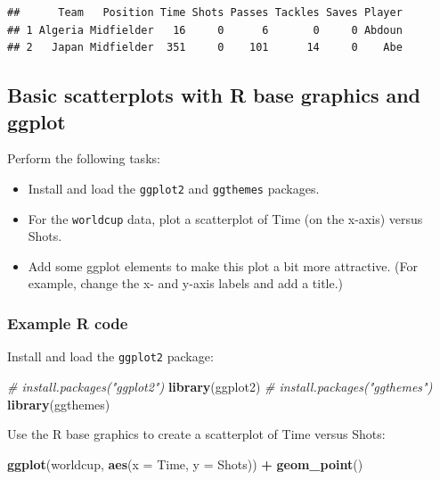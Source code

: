 \documentclass[]{book}
\makeatletter
\newenvironment{Shaded}{\begin{snugshade}}{\end{snugshade}}
\newcommand{\KeywordTok}[1]{\textcolor[rgb]{0.13,0.29,0.53}{\textbf{#1}}}
\newcommand{\DataTypeTok}[1]{\textcolor[rgb]{0.13,0.29,0.53}{#1}}
\newcommand{\StringTok}[1]{\textcolor[rgb]{0.31,0.60,0.02}{#1}}
\newcommand{\CommentTok}[1]{\textcolor[rgb]{0.56,0.35,0.01}{\textit{#1}}}
\newcommand{\OperatorTok}[1]{\textcolor[rgb]{0.81,0.36,0.00}{\textbf{#1}}}
\newcommand{\NormalTok}[1]{#1}
\providecommand{\tightlist}{%
  \setlength{\itemsep}{0pt}\setlength{\parskip}{0pt}}
\newenvironment{kframe}{%
\medskip{}
\setlength{\fboxsep}{.8em}
 \def\at@end@of@kframe{}%
 \ifinner\ifhmode%
  \def\at@end@of@kframe{\end{minipage}}%
  \begin{minipage}{\columnwidth}%
 \fi\fi%
 \def\FrameCommand##1{\hskip\@totalleftmargin \hskip-\fboxsep
 \colorbox{shadecolor}{##1}\hskip-\fboxsep
     \hskip-\linewidth \hskip-\@totalleftmargin \hskip\columnwidth}%
 \MakeFramed {\advance\hsize-\width
   \@totalleftmargin\z@ \linewidth\hsize
   \@setminipage}}%
 {\par\unskip\endMakeFramed%
 \at@end@of@kframe}
\renewenvironment{Shaded}{\begin{kframe}}{\end{kframe}}
\theoremstyle{definition}
\theoremstyle{definition}
\theoremstyle{definition}
\theoremstyle{remark}
\makeatother
\begin{document}
\begin{verbatim}
##      Team   Position Time Shots Passes Tackles Saves Player
## 1 Algeria Midfielder   16     0      6       0     0 Abdoun
## 2   Japan Midfielder  351     0    101      14     0    Abe
\end{verbatim}

\subsection{Basic scatterplots with R base graphics and
ggplot}\label{basic-scatterplots-with-r-base-graphics-and-ggplot}

Perform the following tasks:

\begin{itemize}
\tightlist
\item
  Install and load the \texttt{ggplot2} and \texttt{ggthemes} packages.
\item
  For the \texttt{worldcup} data, plot a scatterplot of Time (on the
  x-axis) versus Shots.
\item
  Add some ggplot elements to make this plot a bit more attractive. (For
  example, change the x- and y-axis labels and add a title.)
\end{itemize}

\subsubsection{Example R code}\label{example-r-code-7}

Install and load the \texttt{ggplot2} package:

\begin{Shaded}
\begin{Highlighting}[]
\CommentTok{# install.packages("ggplot2")}
\KeywordTok{library}\NormalTok{(ggplot2)}
\CommentTok{# install.packages("ggthemes")}
\KeywordTok{library}\NormalTok{(ggthemes)}
\end{Highlighting}
\end{Shaded}

Use the R base graphics to create a scatterplot of Time versus Shots:

\begin{Shaded}
\begin{Highlighting}[]
\KeywordTok{ggplot}\NormalTok{(worldcup, }\KeywordTok{aes}\NormalTok{(}\DataTypeTok{x =}\NormalTok{ Time, }\DataTypeTok{y =}\NormalTok{ Shots)) }\OperatorTok{+}\StringTok{ }
\StringTok{        }\KeywordTok{geom_point}\NormalTok{()}
\end{Highlighting}
\end{Shaded}
\end{document}
